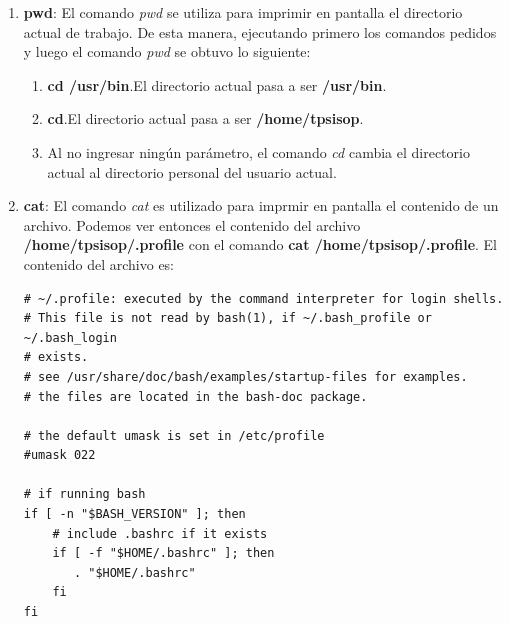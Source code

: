 \documentclass[a4paper,11pt] {article}
\begin{document}
\begin{enumerate}
	\item \textbf{pwd}: El comando \textit{pwd} se utiliza para imprimir en pantalla el directorio actual de trabajo. De esta manera, ejecutando primero los comandos pedidos y luego el comando \textit{pwd} se obtuvo lo siguiente:
	\begin{enumerate}
		\item \textbf{cd /usr/bin}.El directorio actual pasa a ser \textbf{/usr/bin}.
		\item \textbf{cd}.El directorio actual pasa a ser \textbf{/home/tpsisop}.
		\item Al no ingresar ning\'un par\'ametro, el comando \textit{cd} cambia el directorio actual al directorio personal del usuario actual.
	\end{enumerate}
	\item \textbf{cat}: El comando \textit{cat} es utilizado para imprmir en pantalla el contenido de un archivo. Podemos ver entonces el contenido del archivo \textbf{/home/tpsisop/.profile} con el comando \textbf{cat /home/tpsisop/.profile}.
	El contenido del archivo es:
	\begin{verbatim}
# ~/.profile: executed by the command interpreter for login shells.
# This file is not read by bash(1), if ~/.bash_profile or ~/.bash_login
# exists.
# see /usr/share/doc/bash/examples/startup-files for examples.
# the files are located in the bash-doc package.

# the default umask is set in /etc/profile
#umask 022

# if running bash
if [ -n "$BASH_VERSION" ]; then
    # include .bashrc if it exists
    if [ -f "$HOME/.bashrc" ]; then
       . "$HOME/.bashrc"
    fi
fi


\end{verbatim}
\end{enumerate}
\end{document}
